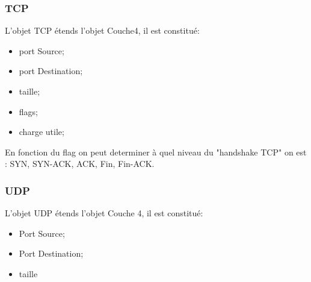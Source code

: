     \subsubsection{TCP}
L'objet TCP étends l'objet Couche4, il est constitué:
\begin{itemize}
    \item port Source;
    \item port Destination;
    \item taille;
    \item flags;
    \item charge utile;
\end{itemize}      
En fonction du flag on peut determiner à quel niveau du "handshake TCP" on est : SYN, SYN-ACK, ACK, Fin, Fin-ACK.

    \subsubsection{UDP}
L'objet UDP étends l'objet Couche 4, il est constitué:
\begin{itemize}
    \item Port Source;
    \item Port Destination;
    \item taille
\end{itemize}   


%
%
%
%
%
%
%
%
%
%
%
%
%
%
%
%
